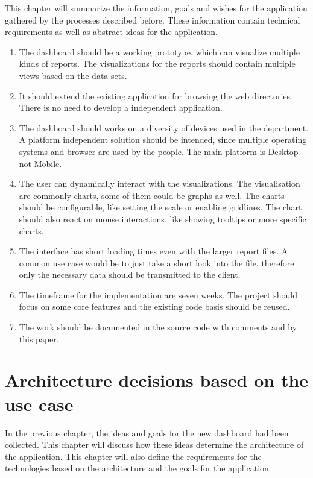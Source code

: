 \documentclass[american,a4paper,oneside,,tablecaptionabove]{scrbook}
\providecommand{\tightlist}{%
  \setlength{\itemsep}{0pt}\setlength{\parskip}{0pt}}
\begin{document}
This chapter will summarize the information, goals and wishes for the
application gathered by the processes described before. These
information contain technical requirements as well as abstract ideas for
the application.

\begin{enumerate}
\def\labelenumi{\arabic{enumi}.}
\tightlist
\item
  The dashboard should be a working prototype, which can visualize
  multiple kinds of reports. The visualizations for the reports should
  contain multiple views based on the data sets.
\item
  It should extend the existing application for browsing the web
  directories. There is no need to develop a independent application.
\item
  The dashboard should works on a diversity of devices used in the
  department. A platform independent solution should be intended, since
  multiple operating systems and browser are used by the people. The
  main platform is Desktop not Mobile.
\item
  The user can dynamically interact with the visualizations. The
  visualisation are commonly charts, some of them could be graphs as
  well. The charts should be configurable, like setting the scale or
  enabling gridlines. The chart should also react on mouse interactions,
  like showing tooltips or more specific charts.
\item
  The interface has short loading times even with the larger report
  files. A common use case would be to just take a short look into the
  file, therefore only the necessary data should be transmitted to the
  client.
\item
  The timeframe for the implementation are seven weeks. The project
  should focus on some core features and the existing code basis should
  be reused.
\item
  The work should be documented in the source code with comments and by
  this paper.
\end{enumerate}

\chapter{Architecture decisions based on the use
case}\label{architecture-decisions-based-on-the-use-case}

In the previous chapter, the ideas and goals for the new dashboard had
been collected. This chapter will discuss how these ideas determine the
architecture of the application. This chapter will also define the
requirements for the technologies based on the architecture and the
goals for the application.
\end{document}
